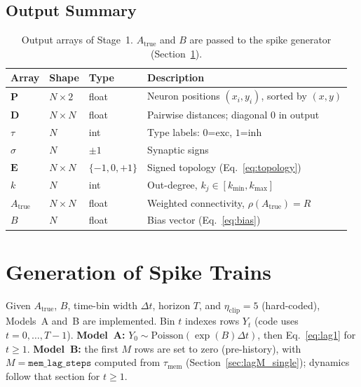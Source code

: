 \documentclass[11pt]{article}
\begin{document}
\subsection{Output Summary}

\begin{table}[h]
\centering
\begin{tabular}{llll}
\toprule
Array & Shape & Type & Description \\
\midrule
$\mathbf{P}$          & $N\times 2$ & float
  & Neuron positions $(x_i,y_i)$, sorted by $(x,y)$ \\
$\mathbf{D}$          & $N\times N$ & float
  & Pairwise distances; diagonal $0$ in output \\
$\tau$                & $N$         & int
  & Type labels: $0$=exc, $1$=inh \\
$\sigma$              & $N$         & $\pm1$
  & Synaptic signs \\
$\mathbf{E}$          & $N\times N$ & $\{-1,0,+1\}$
  & Signed topology (Eq.~\ref{eq:topology}) \\
$k$                   & $N$         & int
  & Out-degree, $k_j\in[k_{\text{min}},k_{\text{max}}]$ \\
$A_{\text{true}}$     & $N\times N$ & float
  & Weighted connectivity, $\rho(A_{\text{true}})=R$ \\
$B$                   & $N$         & float
  & Bias vector (Eq.~\ref{eq:bias}) \\
\bottomrule
\end{tabular}
\caption{Output arrays of Stage~1.
$A_{\text{true}}$ and $B$ are passed to the spike generator
(Section~\ref{sec:spike_gen}).}
\label{tab:output}
\end{table}

\section{Generation of Spike Trains}
\label{sec:spike_gen}

Given $A_{\text{true}}$, $B$, time-bin width $\Delta t$, horizon
$T$, and $\eta_{\mathrm{clip}}=5$ (hard-coded), Models~A and~B are
implemented.  Bin $t$ indexes rows $Y_t$ (code uses $t=0,\dots,T-1$).
\textbf{Model~A:} $Y_0\sim\mathrm{Poisson}(\exp(B)\Delta t)$, then
Eq.~\eqref{eq:lag1} for $t\ge 1$.
\textbf{Model~B:} the first $M$ rows are set to zero (pre-history),
with $M=\texttt{mem\_lag\_steps}$ computed from $\tau_{\mathrm{mem}}$
(Section~\ref{sec:lagM_single}); dynamics follow that section for $t\ge 1$.
\end{document}
